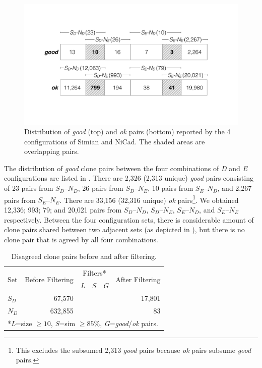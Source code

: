 \documentclass[sigconf,review, anonymous]{acmart}
\begin{document}
\begin{figure}
	\centering
	\includegraphics[width=0.9\linewidth]{good-ok_pairs}
	\caption{Distribution of \textit{good} (top) and \textit{ok} pairs (bottom) reported by the 4 configurations of Simian and NiCad. The shaded areas are overlapping pairs.}
	\label{fig:good-ok-pairs}
\end{figure}

The distribution of \textit{good} clone pairs between the four
combinations of \textit{D} and \textit{E} configurations are listed in
.  There are 2,326 (2,313 unique)
\textit{good} pairs consisting of 23 pairs from $S_D$--$N_D$, 26 pairs
from $S_D$--$N_E$, 10 pairs from $S_E$--$N_D$, and 2,267 pairs from
$S_E$--$N_E$. There are 33,156 (32,316 unique) \textit{ok}
pairs\footnote{This excludes the subsumed 2,313 \textit{good}
  pairs because \textit{ok} pairs subsume
  \textit{good} pairs.}. We obtained 12,336; 993; 79; and 20,021 pairs
from $S_D$--$N_D$, $S_D$--$N_E$, $S_E$--$N_D$, and $S_E$--$N_E$
respectively. Between the four configuration sets, there is
considerable amount of clone pairs shared between two adjacent sets
(as depicted in ), but there is no clone pair
that is agreed by all four combinations.

\begin{table}
	\centering
	\caption{Disagreed clone pairs before and after filtering.}
	\label{tab:online_clone_pairs}
	\begin{tabular}{l|r|c|c|c|r}
		\hline
		\multirow{2}{*}{Set} & \multirow{2}{*}{Before Filtering} & \multicolumn{3}{c|}{Filters*} & \multirow{2}{*}{After Filtering} \\ \cline{3-5}
		& & \textit{L} & \textit{S} & \textit{G} & \\
		\hline 
		\multirow{1}{*}{$S_D$} & 67,570 & \checkmark & & \checkmark & 17,801 \\
		\multirow{1}{*}{$N_D$} & 632,855 & \checkmark & \checkmark & \checkmark & 83 \\ 
		\hline
		\multicolumn{6}{l}{*\textit{L}=size $\geq 10$, \textit{S}=sim $\geq 85\%$, \textit{G}=\textit{good}/\textit{ok} pairs.}  \\
	\end{tabular} %
\end{table}
\end{document}
